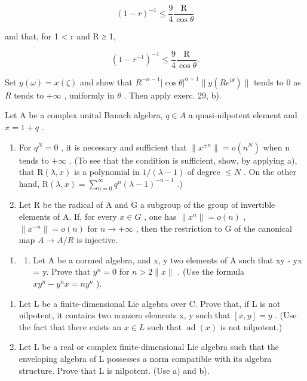 \[
(1 - r) ^ {- 1} \leqslant \frac {9}{4} \frac {\mathrm{R}}{\cos \theta}
\]

and that, for 1 \textless{} r and R ≥ 1,

\[
(1 - r ^ {- 1}) ^ {- 1} \leqslant \frac {9}{4} \frac {\mathrm{R}}{\cos \theta}.
\]

Set \(y(\omega) = x(\zeta)\) and show that \(R^{-\alpha - 1}|\cos \theta|^{\alpha + 1}\| y(Re^{i\theta})\|\) tends to 0 as \(R\) tends to \(+\infty\) , uniformly in \(\theta\) . Then apply exerc. 29, b).

Let A be a complex unital Banach algebra, \(q \in A\) a quasi-nilpotent element and \(x = 1 + q\) .

\begin{enumerate}
\def\labelenumi{\alph{enumi})}
\setcounter{enumi}{1}
\item
  For \(q^{N}=0\) , it is necessary and sufficient that \(\|x^{\pm n}\|=o(n^{N})\) when n tends to \(+\infty\) . (To see that the condition is sufficient, show, by applying a), that \(\mathrm{R}(\lambda,x)\) is a polynomial in \(1/(\lambda-1)\) of degree \(\leqslant N\) . On the other hand, \(\mathrm{R}(\lambda,x)=\sum_{n=0}^{\infty}q^{n}(\lambda-1)^{-n-1}\) .)
\item
  Let R be the radical of A and G a subgroup of the group of invertible elements of A. If, for every \(x \in G\) , one has \(\|x^{n}\| = o(n)\) , \(\|x^{-n}\| = o(n)\) for \(n \to +\infty\) , then the restriction to G of the canonical map \(A \to A/R\) is injective.
\end{enumerate}

\begin{enumerate}
\def\labelenumi{\arabic{enumi})}
\setcounter{enumi}{30}
\tightlist
\item
  \begin{enumerate}
  \def\labelenumii{\alph{enumii})}
  \tightlist
  \item
    Let A be a normed algebra, and x, y two elements of A such that xy - yx = y. Prove that \(y^{n} = 0\) for \(n > 2\|x\|\) . (Use the formula \(xy^{n} - y^{n}x = ny^{n}\) ).
  \end{enumerate}
\end{enumerate}

\begin{enumerate}
\def\labelenumi{\alph{enumi})}
\setcounter{enumi}{1}
\item
  Let L be a finite-dimensional Lie algebra over C. Prove that, if L is not nilpotent, it contains two nonzero elements x, y such that \([x, y] = y\) . (Use the fact that there exists an \(x \in L\) such that \(\operatorname{ad}(x)\) is not nilpotent.)
\item
  Let L be a real or complex finite-dimensional Lie algebra such that the enveloping algebra of L possesses a norm compatible with its algebra structure. Prove that L is nilpotent. (Use a) and b).
\end{enumerate}

